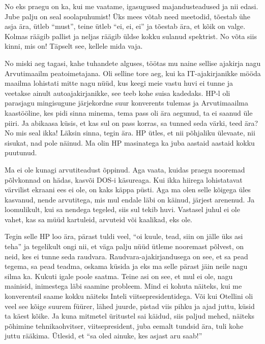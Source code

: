 
No eks  praegu on ka, kui me vaatame, igasugused majandusteadused ja nii edasi. 
Jube palju on seal soolapuhumist! Üks mees võtab need meetodid, tõestab ühe 
asja ära, ütleb \enquote{must}, teine ütleb \enquote{ei, ei, ei} ja tõestab 
ära, et kõik on valge. Kolmas räägib pallist ja neljas räägib üldse kokku 
sulanud spektrist. No võta siis kinni, mis on! Täpselt see, kellele mida vaja.
                 

No miski aeg tagasi, kahe tuhandete alguses, töötas mu naine sellise ajakirja 
nagu Arvutimaailm peatoimetajana. Oli selline tore aeg, kui 
ka IT-ajakirjanikke  mööda maailma lohistati mitte nagu nüüd, kus  keegi meie 
vastu huvi ei tunne ja veetakse ainult autoajakirjanikke, see teeb kohe suisa 
kadedaks. HP-l oli parasjagu mingisugune järjekordne suur konverents tulemas ja 
Arvutimaailma kaastööline, kes pidi sinna minema, tema pass oli ära aegunud, ta 
ei saanud üle piiri. Ja abikaasa küsis, et kas sul on pass korras, sa tunned 
seda värki, teed ära? No mis seal ikka! Läksin sinna, tegin ära. HP ütles, et 
nii põhjaliku ülevaate, nii sisukat, nad pole näinud. Ma olin HP masinatega ka 
juba aastaid aastaid kokku puutunud. 

Ma  ei ole kunagi arvutiteadust õppinud. Aga vaata, kuidas praegu nooremad 
põlvkonnad on hädas, kasvõi DOS-i käsureaga. Kui ikka hiirega lohistatavat 
värvilist ekraani ees ei ole, on kaks käppa püsti. Aga ma olen selle kõigega 
üles kasvanud, nende arvutitega, mis mul endale läbi on käinud, järjest 
arenenud. Ja loomulikult, kui sa nendega tegeled, siis sul tekib huvi. Vastasel 
juhul ei ole vahet, kas sa müüd kartuleid, arvuteid või kaalikad, eks ole. 

Tegin selle HP loo ära, pärast tuldi veel, \enquote{oi kuule, tead, siin on 
jälle üks asi teha} ja tegelikult ongi nii, et väga palju nüüd ütleme nooremast 
põlvest, on neid, kes ei tunne seda raudvara. Raudvara-ajakirjandusega on see, 
et sa pead tegema, sa pead teadma, oskama küsida ja eks ma selle pärast jäin 
neile nagu silma ka. Kukuti igale poole saatma. Teine asi on see, et mul ei 
ole, nagu mainisid, inimestega läbi saamine probleem. Mind ei  kohuta  näiteks, 
kui me konverentsil saame kokku näiteks Inteli viitsepresidentidega. Või kui 
Otellini  oli veel see 
kõige suurem füürer, lähed juurde, pistad viis pihku ja ajad  juttu, küsid ta 
käest kõike. Ja kuna mitmetel üritustel sai käidud, siis paljud mehed, näiteks 
põhimine tehnikaohvitser, viitsepresident, juba eemalt tundsid ära,  tuli kohe 
juttu rääkima. Ütlesid, et \enquote{sa oled ainuke, kes asjast aru saab!}

